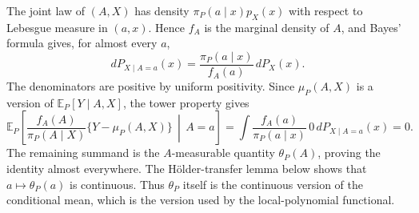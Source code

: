 The joint law of \((A,X)\) has density \(\pi_P(a\mid x)p_X(x)\) with respect to Lebesgue measure in \((a,x)\). Hence \(f_A\) is the marginal density of \(A\), and Bayes' formula gives, for almost every \(a\),
\[
dP_{X\mid A=a}(x)=\frac{\pi_P(a\mid x)}{f_A(a)}\,dP_X(x).
\]
The denominators are positive by uniform positivity. Since \(\mu_P(A,X)\) is a version of \(\mathbb E_P[Y\mid A,X]\), the tower property gives
\[
\mathbb E_P\!\left[\frac{f_A(A)}{\pi_P(A\mid X)}\{Y-\mu_P(A,X)\}\,\middle|\,A=a\right]
=\int\frac{f_A(a)}{\pi_P(a\mid x)}\,0\,dP_{X\mid A=a}(x)=0.
\]
The remaining summand is the \(A\)-measurable quantity \(\theta_P(A)\), proving the identity almost everywhere. The Hölder-transfer lemma below shows that \(a\mapsto\theta_P(a)\) is continuous. Thus \(\theta_P\) itself is the continuous version of the conditional mean, which is the version used by the local-polynomial functional.